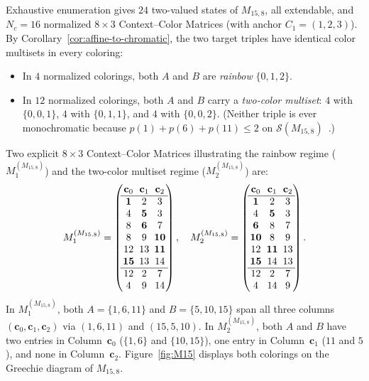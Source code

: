 \documentclass[aps,pra,reprint,superscriptaddress,longbibliography,nofootinbib,floatfix,10pt]{revtex4-2}
\theoremstyle{definition}\newtheorem{definition}[theorem]{Definition}
\theoremstyle{remark}\newtheorem{remark}[theorem]{Remark}
\newcommand{\Sc}{\mathcal S}\newcommand{\Cc}{\mathcal C}\newcommand{\Wc}{\mathcal W}
\begin{document}
Exhaustive enumeration gives $24$ two-valued states of $M_{15,8}$, all extendable, and $N_c=16$ normalized $8\times3$ Context--Color Matrices (with anchor $C_1=(1,2,3)$). By Corollary~\ref{cor:affine-to-chromatic}, the two target triples have identical color multisets in every coloring:
\begin{itemize}
\item In $4$ normalized colorings, both $A$ and $B$ are \emph{rainbow} $\{0,1,2\}$.
\item In $12$ normalized colorings, both $A$ and $B$ carry a \emph{two-color multiset}: $4$ with $\{0,0,1\}$, $4$ with $\{0,1,1\}$, and $4$ with $\{0,0,2\}$. (Neither triple is ever monochromatic because $p(1)+p(6)+p(11)\le 2$ on $\Sc(M_{15,8})$~\cite{2023-navara-svozil}.)
\end{itemize}
Two explicit $8\times 3$ Context--Color Matrices illustrating the rainbow regime ($M_1^{(M_{15,8})}$) and the two-color multiset regime ($M_2^{(M_{15,8})}$) are:
\begin{equation}\label{eq:M15-matrices}
\setlength{\arraycolsep}{2.5pt}
M_1^{(M_{15,8})}=\begin{pmatrix}
\mathbf{c}_0&\mathbf{c}_1&\mathbf{c}_2\\\hline
\mathbf{1}&2&3\\
4&\mathbf{5}&3\\
8&\mathbf{6}&7\\
8&9&\mathbf{10}\\
12&13&\mathbf{11}\\
\mathbf{15}&13&14\\\hline
12&2&7\\
4&9&14
\end{pmatrix},\quad
M_2^{(M_{15,8})}=\begin{pmatrix}
\mathbf{c}_0&\mathbf{c}_1&\mathbf{c}_2\\\hline
\mathbf{1}&2&3\\
4&\mathbf{5}&3\\
\mathbf{6}&8&7\\
\mathbf{10}&8&9\\
12&\mathbf{11}&13\\
\mathbf{15}&14&13\\\hline
12&2&7\\
4&14&9
\end{pmatrix}.
\end{equation}
In $M_1^{(M_{15,8})}$, both $A=\{1,6,11\}$ and $B=\{5,10,15\}$ span all three columns $(\mathbf{c}_0,\mathbf{c}_1,\mathbf{c}_2)$ via $(1,6,11)$ and $(15,5,10)$. In $M_2^{(M_{15,8})}$, both $A$ and $B$ have two entries in Column~$\mathbf{c}_0$ ($\{1,6\}$ and $\{10,15\}$), one entry in Column~$\mathbf{c}_1$ ($11$ and $5$), and none in Column~$\mathbf{c}_2$. Figure~\ref{fig:M15} displays both colorings on the Greechie diagram of $M_{15,8}$.
\end{document}
